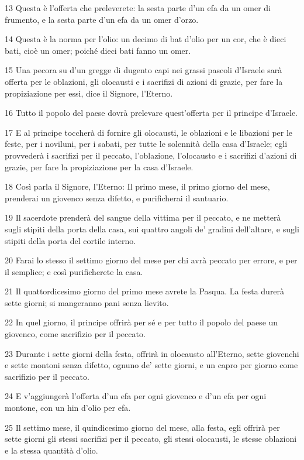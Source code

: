 \par 13 Questa è l'offerta che preleverete: la sesta parte d'un efa da un omer di frumento, e la sesta parte d'un efa da un omer d'orzo.
\par 14 Questa è la norma per l'olio: un decimo di bat d'olio per un cor, che è dieci bati, cioè un omer; poiché dieci bati fanno un omer.
\par 15 Una pecora su d'un gregge di dugento capi nei grassi pascoli d'Israele sarà offerta per le oblazioni, gli olocausti e i sacrifizi di azioni di grazie, per fare la propiziazione per essi, dice il Signore, l'Eterno.
\par 16 Tutto il popolo del paese dovrà prelevare quest'offerta per il principe d'Israele.
\par 17 E al principe toccherà di fornire gli olocausti, le oblazioni e le libazioni per le feste, per i noviluni, per i sabati, per tutte le solennità della casa d'Israele; egli provvederà i sacrifizi per il peccato, l'oblazione, l'olocausto e i sacrifizi d'azioni di grazie, per fare la propiziazione per la casa d'Israele.
\par 18 Così parla il Signore, l'Eterno: Il primo mese, il primo giorno del mese, prenderai un giovenco senza difetto, e purificherai il santuario.
\par 19 Il sacerdote prenderà del sangue della vittima per il peccato, e ne metterà sugli stipiti della porta della casa, sui quattro angoli de' gradini dell'altare, e sugli stipiti della porta del cortile interno.
\par 20 Farai lo stesso il settimo giorno del mese per chi avrà peccato per errore, e per il semplice; e così purificherete la casa.
\par 21 Il quattordicesimo giorno del primo mese avrete la Pasqua. La festa durerà sette giorni; si mangeranno pani senza lievito.
\par 22 In quel giorno, il principe offrirà per sé e per tutto il popolo del paese un giovenco, come sacrifizio per il peccato.
\par 23 Durante i sette giorni della festa, offrirà in olocausto all'Eterno, sette giovenchi e sette montoni senza difetto, ognuno de' sette giorni, e un capro per giorno come sacrifizio per il peccato.
\par 24 E v'aggiungerà l'offerta d'un efa per ogni giovenco e d'un efa per ogni montone, con un hin d'olio per efa.
\par 25 Il settimo mese, il quindicesimo giorno del mese, alla festa, egli offrirà per sette giorni gli stessi sacrifizi per il peccato, gli stessi olocausti, le stesse oblazioni e la stessa quantità d'olio.

